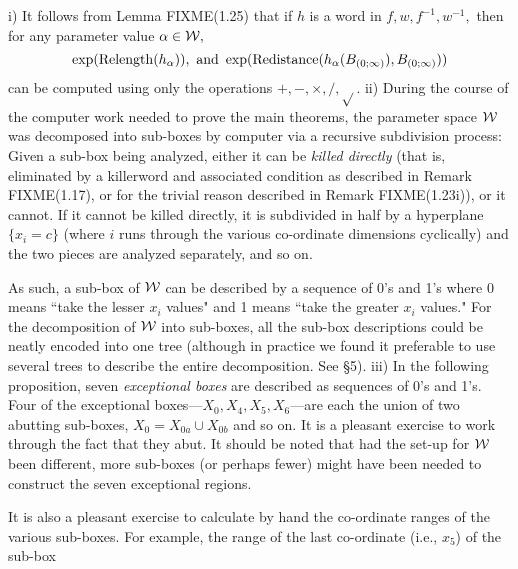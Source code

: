  i)  It follows from Lemma FIXME(1.25) that if $h$ is a word in $f,w,f^{-1},w^{-1},$ then for any
parameter value $\alpha\in {\cal W},$
$$\exp({\rm Relength}(h_\alpha)), \hbox{ and }
  \exp({\rm Redistance}(h_\alpha(B_{(0;\infty)}), B_{(0;\infty)}))$$ can be computed using only the
operations $+, -, \times, /, \sqrt{}.$
 ii) During the course of the computer work needed to prove the main theorems, the parameter space
${\cal W}$ was decomposed into sub-boxes by computer via a recursive subdivision process:
Given a sub-box  being analyzed, either it can be {\it killed directly} (that is, eliminated by a killerword and associated condition as described in
Remark FIXME(1.17),
or for the trivial reason described in Remark FIXME(1.23i)), or it cannot.  
If it cannot be killed directly, it is subdivided in half by a hyperplane
$\{x_i = c \}$ (where $i$ runs through the various co-ordinate dimensions
cyclically) and the two pieces are analyzed separately, and so on. 

As such, a sub-box of ${\cal W}$ can be described by a sequence of 0's and 1's where 0 means ``take the lesser $x_i$ values" and 1 means ``take the greater $x_i$ values."  
For the decomposition of ${\cal W}$ into sub-boxes, all the 
sub-box descriptions could be neatly encoded into one tree (although in practice we found it preferable to use several trees to describe the entire
decomposition.  See \S 5).
iii) In the following proposition, seven {\it exceptional boxes} are described as sequences of 0's and 1's.  
Four of the exceptional boxes---$X_0, X_4, X_5, X_6$---are each the union of two abutting sub-boxes, $X_0 = X_{0a} \cup X_{0b}$ and so on.  It is a pleasant exercise to work through the fact that they abut.  
It should be noted that had the set-up for ${\cal W}$ been different, more sub-boxes (or perhaps fewer) might have been needed to construct the seven
exceptional regions. 

It is also a pleasant exercise to calculate by hand the co-ordinate ranges of the various sub-boxes.  For example, the range of the last co-ordinate (i.e., $x_5$) of the sub-box 
\eject


